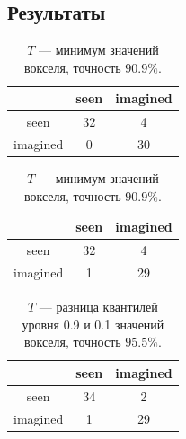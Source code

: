 \documentclass{beamer}
\begin{document}
		\subsection{Результаты}
			\begin{frame} 
				\vspace{0.5cm}	
				
				\begin{table}
					\begin{minipage}{.5\linewidth}				
						\begin{tabular}{c|cc}
							& \multicolumn{1}{c|}{seen} & imagined \\ \hline
							seen     & 32                        & 4        \\ \cline{1-1}
							imagined & 0                         & 30      
						\end{tabular}
						\caption{$T$ --- среднее значение вокселя, точность $93.9\%$.}
					\end{minipage}%
					\begin{minipage}{.5\linewidth}				
						\begin{tabular}{c|cc}
							& \multicolumn{1}{c|}{seen} & imagined \\ \hline
							seen     & 32                        & 4        \\ \cline{1-1}
							imagined & 1                         & 29      
						\end{tabular}
						\caption{$T$ --- минимум значений вокселя, точность $90.9\%$.}
					\end{minipage} 
				\end{table}
				
				\begin{table}[]
					\begin{tabular}{c|cc}
						& \multicolumn{1}{c|}{seen} & imagined \\ \hline
						seen     & 34                        & 2        \\ \cline{1-1}
						imagined & 1                         & 29      
					\end{tabular}
					\caption{$T$ --- разница квантилей уровня 0.9 и 0.1 значений вокселя, точность $95.5\%$.}
				\end{table}
			\end{frame}
\end{document}
